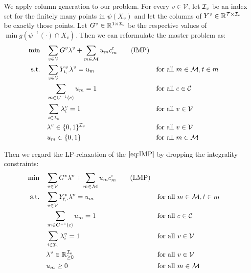 We apply column generation to our problem. For every $v\in\mathcal{V}$, let $\mathcal{I}_v$ be an index set for the finitely many points in $\psi\left(X_v\right)$ and let the columns of $Y^v\in\mathbb{R}^{\mathcal{T}\times\mathcal{I}_v}$ be exactly those points. Let $G^v\in\mathbb{R}^{1\times\mathcal{I}_v}$ be the respective values of $\min g\left(\psi^{-1}(\cdot)\cap X_v\right)$. Then we can reformulate the master problem as: 
\begin{align*}
	\min \quad & \sum_{v\in\mathcal{V}}G^v\lambda^v + \sum_{m\in\mathcal{M}}u_mc^{\operatorname{r}}_m \tag{IMP} \label{eq:IMP} \\
	\text{s.t.} \quad & \sum_{v\in\mathcal{V}} Y^v_{t,\cdot}\lambda^v = u_m && \text{for all } m\in\mathcal{M},t\in m \\
	& \sum_{m\in C^{-1}(c)} u_m = 1 && \text{for all } c\in\mathcal{C} \\
	& \sum_{i\in\mathcal{I}_v}\lambda_i^v=1 && \text{for all } v\in\mathcal{V}\\
	& \lambda^v\in\{0,1\}^{\mathcal{I}_v} && \text{for all } v\in\mathcal{V} \\
	& u_m\in\{0,1\} && \text{for all } m\in\mathcal{M}
\end{align*}

Then we regard the LP-relaxation of the $\eqref{eq:IMP}$ by dropping the integrality constraints: 
\begin{align*}
	\min \quad & \sum_{v\in\mathcal{V}}G^v\lambda^v + \sum_{m\in\mathcal{M}}u_mc^{\operatorname{r}}_m \tag{LMP} \label{eq:LMP} \\
	\text{s.t.} \quad & \sum_{v\in\mathcal{V}} Y^v_{t,\cdot}\lambda^v = u_m && \text{for all } m\in\mathcal{M},t\in m \\
	& \sum_{m\in C^{-1}(c)} u_m = 1 && \text{for all } c\in\mathcal{C} \\
	& \sum_{i\in\mathcal{I}_v}\lambda_i^v=1 && \text{for all } v\in\mathcal{V}\\
	& \lambda^v\in\mathbb{R}_{\geq 0}^{\mathcal{I}_v} && \text{for all } v\in\mathcal{V} \\
	& u_m\geq 0 && \text{for all } m\in\mathcal{M}
\end{align*}

